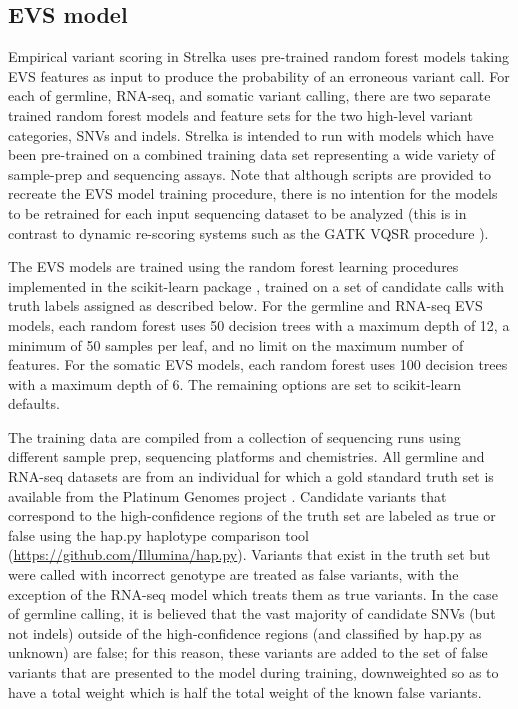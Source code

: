 \documentclass{article}
\begin{document}
\subsection{EVS model}

Empirical variant scoring in Strelka uses pre-trained random forest models taking EVS features as input to produce the probability of an erroneous variant call. For each of germline, RNA-seq, and somatic variant calling, there are two separate trained random forest models and feature sets for the two high-level variant categories, SNVs and indels. Strelka is intended to run with models which have been pre-trained on a combined training data set representing a wide variety of sample-prep and sequencing assays. Note that although scripts are provided to recreate the EVS model training procedure, there is no intention for the models to be retrained for each input sequencing dataset to be analyzed (this is in contrast to dynamic re-scoring systems such as the GATK VQSR procedure \cite{depristo2011}).

The EVS models are trained using the random forest learning procedures implemented in the scikit-learn package \cite{scikit-learn}, trained on a set of candidate calls with truth labels assigned as described below. For the germline and RNA-seq EVS models, each random forest uses 50 decision trees with a maximum depth of 12, a minimum of 50 samples per leaf, and no limit on the maximum number of features. For the somatic EVS models, each random forest uses 100 decision trees with a maximum depth of 6. The remaining options are set to scikit-learn defaults.

The training data are compiled from a collection of sequencing runs using different sample prep, sequencing platforms and chemistries. All germline and RNA-seq datasets are from an individual for which a gold standard truth set is available from the Platinum Genomes project \cite{eberle2017}. Candidate variants that correspond to the high-confidence regions of the truth set are labeled as true or false using the hap.py haplotype comparison tool (\url{https://github.com/Illumina/hap.py}). Variants that exist in the truth set but were called with incorrect genotype are treated as false variants, with the exception of the RNA-seq model which treats them as true variants. In the case of germline calling, it is believed that the vast majority of candidate SNVs (but not indels) outside of the high-confidence regions (and classified by hap.py as unknown) are false; for this reason, these variants are added to the set of false variants that are presented to the model during training, downweighted so as to have a total weight which is half the total weight of the known false variants.
\end{document}
